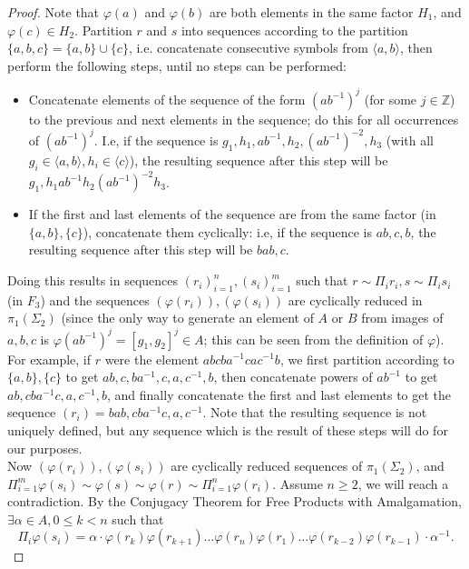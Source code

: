 \documentclass[11pt]{article}
\newcommand{\Z}{\mathbb{Z}}
\begin{document}
    \begin{proof}
        Note that $\varphi(a)$ and $\varphi(b)$ are both elements in the same factor $H_1$, and $\varphi(c) \in H_2$. Partition $r$ and $s$ into sequences according to the partition $\{a,b,c\} = \{a,b\} \cup \{c\}$, i.e. concatenate consecutive symbols from $\langle a,b \rangle$, then perform the following steps, until no steps can be performed:
        
        \begin{itemize}
        \item 
            Concatenate elements of the sequence of the form $(ab^{-1})^j$ (for some $j \in \Z$) to the previous and next elements in the sequence; do this for all occurrences of $(ab^{-1})^j$. I.e, if the sequence is $g_1, h_1, ab^{-1}, h_2, (ab^{-1})^{-2}, h_3$ (with all $g_i \in \langle a,b \rangle, h_i \in \langle c \rangle$), the resulting sequence after this step will be $g_1, h_1 ab^{-1} h_2 (ab^{-1})^{-2} h_3$.
        \item
            If the first and last elements of the sequence are from the same factor (in $\{a,b\},\{c\}$), concatenate them cyclically: i.e, if the sequence is $ab, c, b$, the resulting sequence after this step will be $bab, c$.
        \end{itemize}
        
        Doing this results in sequences $(r_i)_{i=1}^n,(s_i)_{i=1}^m$ such that $r \sim \Pi_i r_i, s \sim \Pi_i s_i$ (in $F_3$) and the sequences $(\varphi(r_i)), (\varphi(s_i))$ are cyclically reduced in $\pi_1(\Sigma_2)$ (since the only way to generate an element of $A$ or $B$ from images of $a,b,c$ is $\varphi(ab^{-1})^j = [g_1,g_2]^j \in A$; this can be seen from the definition of $\varphi$). For example, if $r$ were the element $abcba^{-1}cac^{-1}b$, we first partition according to $\{a,b\},\{c\}$ to get $ab, c, ba^{-1}, c, a, c^{-1}, b$, then concatenate powers of $ab^{-1}$ to get $ab, cba^{-1}c, a, c^{-1}, b$, and finally concatenate the first and last elements to get the sequence $(r_i) = bab, cba^{-1}c, a, c^{-1}$. Note that the resulting sequence is not uniquely defined, but any sequence which is the result of these steps will do for our purposes. \\
        
        Now $(\varphi(r_i)), (\varphi(s_i))$ are cyclically reduced sequences of $\pi_1(\Sigma_2)$, and $\Pi_{i=1}^m \varphi(s_i) \sim \varphi(s) \sim \varphi(r) \sim \Pi_{i=1}^n \varphi(r_i)$. Assume $n \geq 2$, we will reach a contradiction. By the Conjugacy Theorem for Free Products with Amalgamation, $\exists \alpha \in A, 0 \leq k < n$ such that
        \begin{equation}
        \label{eq:1}
            \Pi_i \varphi(s_i) = \alpha \cdot \varphi(r_k) \varphi(r_{k+1}) ... \varphi(r_n) \varphi(r_1) ... \varphi(r_{k-2}) \varphi(r_{k-1}) \cdot \alpha^{-1} .
        \end{equation}
        

\end{proof}
\end{document}
